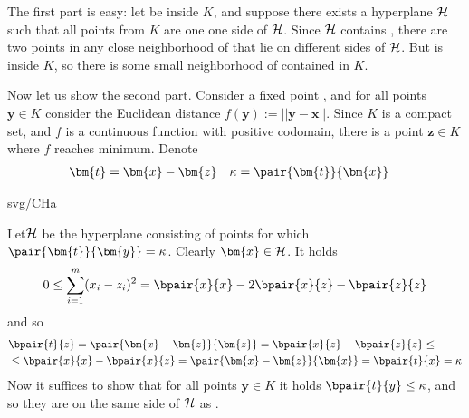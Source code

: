\begin{shaded}
\begin{dokaz}
  The first part is easy: let  be inside $K$, and suppose there exists a hyperplane $\cal H$ such that
  all points from $K$ are one one side of $\cal H$. Since $\cal H$ contains ,
  there are two points in any close neighborhood of  that lie on different sides of $\cal H$. 
  But  is inside $K$, so there is some small neighborhood of  contained in $K$.

\noindent
Now let us show the second part.
Consider a fixed point , and for all points $\bm{y}\in K$ consider the Euclidean distance 
$f(\bm{y}):=||\bm{y}-\bm{x}||$. Since $K$ is a compact set, and $f$ is a continuous function with positive codomain,
there is a point  $\bm{z}\in K$ where $f$ reaches minimum. Denote
  \begin{align*}
    \bm{t}&=\bm{x}-\bm{z} & \kappa&= \pair{\bm{t}}{\bm{x}}
  \end{align*}

\begin{minipage}[t]{4.5cm}
  \vspace{0pt}
  \begin{myfig}{\textwidth}{svg/CHa}
  \end{myfig}
\end{minipage}\hspace*{1cm}\begin{minipage}[t]{\textwidth-7cm}
  \vspace{0pt}
  Let$\cal H$ be the hyperplane consisting of points   for which $\pair{\bm{t}}{\bm{y}}=\kappa$.
  Clearly $\bm{x}\in{\cal H}$. It holds
  $$0\le\sum_{i=1}^m(x_i-z_i)^2=%
  \bpair{x}{x}-2\bpair{x}{z}-\bpair{z}{z}$$
  and so
  \begin{align*}&\bpair{t}{z}=\pair{\bm{x}-\bm{z}}{\bm{z}}=\bpair{x}{z}-\bpair{z}{z}\le\\
                &\le\bpair{x}{x}-\bpair{x}{z}=\pair{\bm{x}-\bm{z}}{\bm{x}}=\bpair{t}{x}=\kappa
  \end{align*}
  \noindent
  Now it suffices to show that for all points $\bm{y}\in K$ it holds $\bpair{t}{y}\le\kappa$, and so
  they are on the same side of $\cal H$ as .
\end{minipage}


\end{dokaz}
\end{shaded}
